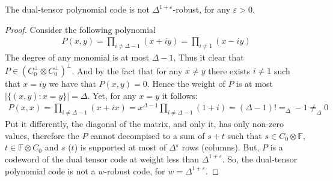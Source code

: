 \begin{claim}
  \label{claim:nowr} The dual-tensor polynomial code is not $\Delta^{1 +\varepsilon}$-robust, for any $\varepsilon > 0$.  
\end{claim}

\begin{proof}
Consider the following polynomial 
  \begin{equation*}
    \begin{split}
      P(x,y) = \prod_{i \neq \Delta - 1}{ \left( x + i y \right)  }=\prod_{i \neq  1}{ \left( x - i y \right)  }  
         \end{split}
  \end{equation*}
  The degree of any monomial is at most $\Delta-1$, Thus it clear that $P \in \left( C_{0}^{\perp} \otimes C_{0}^{\perp} \right)^{\perp}$. And by the fact that for any $x \neq y$ there exists $i\neq 1 $ such that $x = iy$ we have that $P(x,y) = 0$. Hence the weight of $P$ is at most $|\{ (x,y) : x = y \}|= \Delta$. Yet, for any $x = y$ it follows:      
  \begin{equation*}
    \begin{split}
       P(x,x) = \prod_{i \neq \Delta - 1}{ \left( x + i x \right)  }= x^{\Delta-1}\prod_{i \neq \Delta - 1}{ \left( 1 + i \right) } = \left( \Delta-1 \right)!  =_{\Delta} -1  \neq_{\Delta} 0 
    \end{split}
  \end{equation*}
  Put it differently, the diagonal of the matrix, and only it, has only non-zero values, therefore the $P$ cannot decompised to a sum of $s + t$ such that $s \in C_{0}\otimes \mathbb{F}$, $t \in \mathbb{F}\otimes C_{0}$ and $s$ ($t$) is supported at most of $\Delta^{\varepsilon}$ rows (columns). But, $P$ is a codeword of the dual tensor code at weight less than $\Delta^{1 + \varepsilon}$. So, the dual-tensor polynomial code is not a $w$-robust code,  for $w = \Delta^{1 +\varepsilon}$.   
\end{proof}

